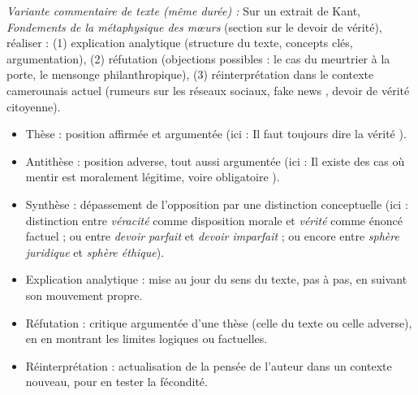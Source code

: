 \documentclass[11pt]{article}
\newcommand{\cle}[1]{{\popxbold\color{popdark}#1}}
\newcounter{popsec}
\newcounter{popsub}
\newcommand{\courssub}[1]{%
  \stepcounter{popsub}%
  \par\vspace{9pt}\noindent{\popxbold\fontsize{11.5}{13}\selectfont\color{popink}{\color{poporange}\thepopsec.\thepopsub}\hspace{6pt}#1}\par\nopagebreak\vspace{4pt}
}
\begin{document}
\emph{Variante commentaire de texte (même durée) :} Sur un extrait de Kant, \emph{Fondements de la métaphysique des mœurs} (section sur le devoir de vérité), réaliser : (1) explication analytique (structure du texte, concepts clés, argumentation), (2) réfutation (objections possibles : le cas du meurtrier à la porte, le mensonge philanthropique), (3) réinterprétation dans le contexte camerounais actuel (rumeurs sur les réseaux sociaux, \guillemotleft fake news \guillemotright, devoir de vérité citoyenne).

\courssub{Ressources à mobiliser}
\begin{definition}
\begin{itemize}
    \item \cle{Thèse} : position affirmée et argumentée (ici : \guillemotleft Il faut toujours dire la vérité \guillemotright).
    \item \cle{Antithèse} : position adverse, tout aussi argumentée (ici : \guillemotleft Il existe des cas où mentir est moralement légitime, voire obligatoire \guillemotright).
    \item \cle{Synthèse} : dépassement de l'opposition par une distinction conceptuelle (ici : distinction entre \emph{véracité} comme disposition morale et \emph{vérité} comme énoncé factuel ; ou entre \emph{devoir parfait} et \emph{devoir imparfait} ; ou encore entre \emph{sphère juridique} et \emph{sphère éthique}).
    \item \cle{Explication analytique} : mise au jour du sens du texte, pas à pas, en suivant son mouvement propre.
    \item \cle{Réfutation} : critique argumentée d'une thèse (celle du texte ou celle adverse), en en montrant les limites logiques ou factuelles.
    \item \cle{Réinterprétation} : actualisation de la pensée de l'auteur dans un contexte nouveau, pour en tester la fécondité.
\end{itemize}
\end{definition}
\end{document}
